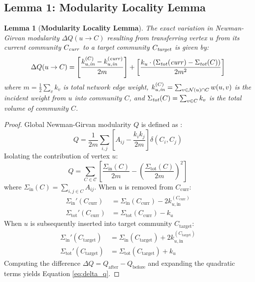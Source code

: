 \documentclass[10pt,journal,compsoc]{IEEEtran}
\newtheorem{lemma}{Lemma}
\begin{document}
\subsection{Lemma 1: Modularity Locality Lemma}
\begin{lemma}[\textbf{Modularity Locality Lemma}]\label{lem:modularity_locality}
The exact variation in Newman-Girvan modularity $\Delta Q(u \to C)$ resulting from transferring vertex $u$ from its current community $C_{\text{\emph{curr}}}$ to a target community $C_{\text{\emph{target}}}$ is given by:
\begin{equation}
\Delta Q(u \to C) = \left[ \frac{k_{u, \text{\emph{in}}}^{(C)} - k_{u, \text{\emph{in}}}^{(\text{\emph{curr}})}}{2m} \right] + \left[ \frac{k_u \cdot (\Sigma_{\text{\emph{tot}}}(\text{\emph{curr}}) - \Sigma_{\text{\emph{tot}}}(C))}{2m^2} \right]
\label{eq:delta_q}
\end{equation}
where $m = \frac{1}{2}\sum_v k_v$ is total network edge weight, $k_{u, \text{\emph{in}}}^{(C)} = \sum_{v \in \mathcal{N}(u) \cap C} w(u, v)$ is the incident weight from $u$ into community $C$, and $\Sigma_{\text{\emph{tot}}}(C) = \sum_{v \in C} k_v$ is the total volume of community $C$.
\end{lemma}

\begin{proof}
Global Newman-Girvan modularity $Q$ is defined as \cite{newman2004finding}:
\begin{equation}
Q = \frac{1}{2m} \sum_{i, j} \left[ A_{ij} - \frac{k_i k_j}{2m} \right] \delta(C_i, C_j)
\end{equation}
Isolating the contribution of vertex $u$:
\begin{equation}
Q = \sum_{C \in \mathcal{C}} \left[ \frac{\Sigma_{\text{in}}(C)}{2m} - \left( \frac{\Sigma_{\text{tot}}(C)}{2m} \right)^2 \right]
\end{equation}
where $\Sigma_{\text{in}}(C) = \sum_{i, j \in C} A_{ij}$. When $u$ is removed from $C_{\text{curr}}$:
\begin{align}
\Sigma_{\text{in}}'(C_{\text{curr}}) &= \Sigma_{\text{in}}(C_{\text{curr}}) - 2 k_{u, \text{in}}^{(C_{\text{curr}})} \\
\Sigma_{\text{tot}}'(C_{\text{curr}}) &= \Sigma_{\text{tot}}(C_{\text{curr}}) - k_u
\end{align}
When $u$ is subsequently inserted into target community $C_{\text{target}}$:
\begin{align}
\Sigma_{\text{in}}'(C_{\text{target}}) &= \Sigma_{\text{in}}(C_{\text{target}}) + 2 k_{u, \text{in}}^{(C_{\text{target}})} \\
\Sigma_{\text{tot}}'(C_{\text{target}}) &= \Sigma_{\text{tot}}(C_{\text{target}}) + k_u
\end{align}
Computing the difference $\Delta Q = Q_{\text{after}} - Q_{\text{before}}$ and expanding the quadratic terms yields Equation \eqref{eq:delta_q}.
\end{proof}
\end{document}
